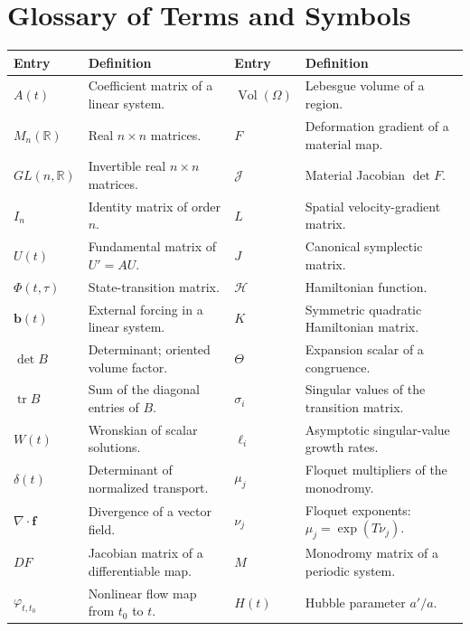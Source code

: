 \documentclass[11pt,a4paper]{article}
\newcommand{\R}{\mathbb{R}}
\DeclareMathOperator{\tr}{tr}
\DeclareMathOperator{\Vol}{Vol}
\theoremstyle{definition}
\numberwithin{equation}{section}
\begin{document}
\section*{Glossary of Terms and Symbols}
\begingroup
\footnotesize
\renewcommand{\arraystretch}{1.07}
\setlength{\tabcolsep}{2pt}
\noindent\begin{tabularx}{\textwidth}{@{}>{\raggedright\arraybackslash}p{}X@{\hspace{14pt}}>{\raggedright\arraybackslash}p{}X@{}}
\toprule
\textbf{Entry} & \textbf{Definition} & \textbf{Entry} & \textbf{Definition} \\
\midrule
$A(t)$ & Coefficient matrix of a linear system. & $\Vol(\Omega)$ & Lebesgue volume of a region. \\
$M_n(\R)$ & Real $n\times n$ matrices. & $F$ & Deformation gradient of a material map. \\
$GL(n,\R)$ & Invertible real $n\times n$ matrices. & $\mathcal J$ & Material Jacobian $\det F$. \\
$I_n$ & Identity matrix of order $n$. & $L$ & Spatial velocity-gradient matrix. \\
$U(t)$ & Fundamental matrix of $U'=AU$. & $J$ & Canonical symplectic matrix. \\
$\Phi(t,\tau)$ & State-transition matrix. & $\mathcal H$ & Hamiltonian function. \\
$\mathbf b(t)$ & External forcing in a linear system. & $K$ & Symmetric quadratic Hamiltonian matrix. \\
$\det B$ & Determinant; oriented volume factor. & $\Theta$ & Expansion scalar of a congruence. \\
$\tr B$ & Sum of the diagonal entries of $B$. & $\sigma_i$ & Singular values of the transition matrix. \\
$W(t)$ & Wronskian of scalar solutions. & $\ell_i$ & Asymptotic singular-value growth rates. \\
$\delta(t)$ & Determinant of normalized transport. & $\mu_j$ & Floquet multipliers of the monodromy. \\
$\nabla\cdot\mathbf f$ & Divergence of a vector field. & $\nu_j$ & Floquet exponents: $\mu_j=\exp(T\nu_j)$. \\
$DF$ & Jacobian matrix of a differentiable map. & $M$ & Monodromy matrix of a periodic system. \\
$\varphi_{t,t_0}$ & Nonlinear flow map from $t_0$ to $t$. & $H(t)$ & Hubble parameter $a'/a$. \\

\end{tabularx}
\end{document}
